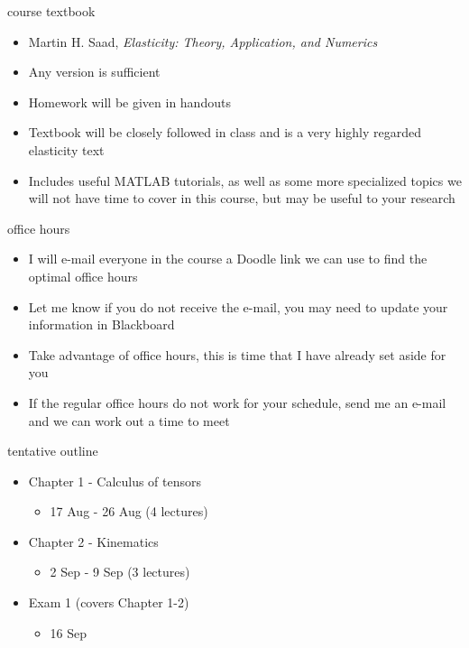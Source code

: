 \documentclass[
  letterpaper,
  ignorenonframetext,
  aspectratio=43,
  handout,
  12pt]{beamer}
\providecommand{\tightlist}{%
  \setlength{\itemsep}{0pt}\setlength{\parskip}{0pt}}
\providecommand{\tightlist}{%
\setlength{\itemsep}{0pt}\setlength{\parskip}{0pt}}
\begin{document}
\begin{frame}{course textbook}
\protect\hypertarget{course-textbook}{}
\begin{itemize}
\tightlist
\item
  Martin H. Saad, \emph{Elasticity: Theory, Application, and Numerics}
\item
  Any version is sufficient
\item
  Homework will be given in handouts
\item
  Textbook will be closely followed in class and is a very highly
  regarded elasticity text
\item
  Includes useful MATLAB tutorials, as well as some more specialized
  topics we will not have time to cover in this course, but may be
  useful to your research
\end{itemize}
\end{frame}

\begin{frame}{office hours}
\protect\hypertarget{office-hours}{}
\begin{itemize}
\tightlist
\item
  I will e-mail everyone in the course a Doodle link we can use to find
  the optimal office hours
\item
  Let me know if you do not receive the e-mail, you may need to update
  your information in Blackboard
\item
  Take advantage of office hours, this is time that I have already set
  aside for you
\item
  If the regular office hours do not work for your schedule, send me an
  e-mail and we can work out a time to meet
\end{itemize}
\end{frame}

\begin{frame}{tentative outline}
\protect\hypertarget{tentative-outline}{}
\begin{itemize}
\tightlist
\item
  Chapter 1 - Calculus of tensors

  \begin{itemize}
  \tightlist
  \item
    17 Aug - 26 Aug (4 lectures)
  \end{itemize}
\item
  Chapter 2 - Kinematics

  \begin{itemize}
  \tightlist
  \item
    2 Sep - 9 Sep (3 lectures)
  \end{itemize}
\item
  Exam 1 (covers Chapter 1-2)

  \begin{itemize}
  \tightlist
  \item
    16 Sep
  \end{itemize}
\end{itemize}
\end{frame}
\end{document}
